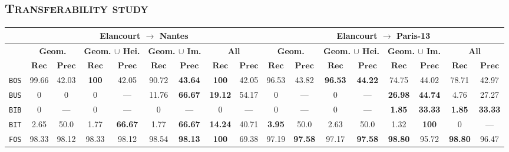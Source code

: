     \subsection{\textsc{Transferability study}}
        \begin{sidewaystable}
            \footnotesize
            \begin{center}
                \begin{tabular}{|c | c c | c c | c c | c c || c c | c c | c c | c c |}
                    \hline
                    & \multicolumn{8}{c||}{\textbf{Elancourt $\rightarrow$ Nantes}} & \multicolumn{8}{c|}{\textbf{Elancourt $\rightarrow$ Paris-13}}\\
                    \hline
                    &\multicolumn{2}{c|}{\textbf{Geom.}} & \multicolumn{2}{c|}{\textbf{Geom. $\cup$ Hei.}} & \multicolumn{2}{c|}{\textbf{Geom. $\cup$ Im.}} & \multicolumn{2}{c||}{\textbf{All}} & \multicolumn{2}{c|}{\textbf{Geom.}} & \multicolumn{2}{c|}{\textbf{Geom. $\cup$ Hei.}} & \multicolumn{2}{c|}{\textbf{Geom. $\cup$ Im.}} & \multicolumn{2}{x{1.5cm}|}{\textbf{All}}\\
                    \cline{2-17}
                    & $\bm{Rec}$ & $\bm{Prec}$ &  $\bm{Rec}$ & $\bm{Prec}$ &  $\bm{Rec}$ & $\bm{Prec}$ &  $\bm{Rec}$ & $\bm{Prec}$ & $\bm{Rec}$ & $\bm{Prec}$ &  $\bm{Rec}$ & $\bm{Prec}$ &  $\bm{Rec}$ & $\bm{Prec}$ &  $\bm{Rec}$ & $\bm{Prec}$ \\
                    \hline
                    \texttt{BOS} & 99.66 & 42.03 & \textbf{100} & 42.05 & 90.72 & \textbf{43.64} & \textbf{100} & 42.05 & 96.53 & 43.82 & \textbf{96.53} & \textbf{44.22} & 74.75 & 44.02 & 78.71 & 42.97 \\
                    \hline
                    \texttt{BUS} & 0 & 0 & 0 & --- & 11.76 & \textbf{66.67} & \textbf{19.12} & 54.17 & 0 & --- & 0 & --- & \textbf{26.98} & \textbf{44.74} & 4.76 & 27.27 \\
                    \hline
                    \texttt{BIB} & 0 & --- & 0 & --- & 0 & --- & 0 & --- & 0 & --- & 0 & --- & \textbf{1.85} & \textbf{33.33} & \textbf{1.85} & \textbf{33.33} \\
                    \hline
                    \texttt{BIT} & 2.65 & 50.0 & 1.77 & \textbf{66.67} & 1.77 & \textbf{66.67} & \textbf{14.24} & 40.71 & \textbf{3.95} & 50.0 & 2.63 & 50.0 & 1.32 & \textbf{100} & 0 & --- \\
                    \hline
                    \texttt{FOS} & 98.33 & 98.12 & 98.33 & 98.12 & 98.54 & \textbf{98.13} & \textbf{100} & 69.38 & 97.19 & \textbf{97.58} & 97.17 & \textbf{97.58} & \textbf{98.80} & 95.72 & \textbf{98.80} & 96.47 \\

\end{tabular}
\end{center}
\end{sidewaystable}
